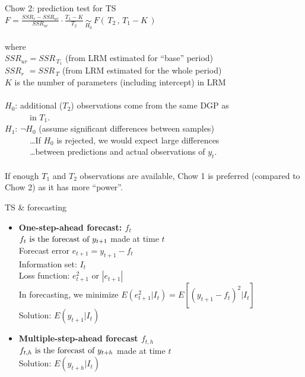 \documentclass{beamer}
\begin{document}
\begin{frame}{Chow 2: prediction test for TS}
~\\
$F = \frac{\textit{SSR}_{r}-\textit{SSR}_{ur}}{\textit{SSR}_{ur}}
   \cdot \frac{T_1-K}{T_2} \,
   \underset{H_0}{\sim} \,
   F(\,T_2 \,,\, T_1\!-\!K \, ) $ \\
~ \\
where\\
$\textit{SSR}_{ur} = \textit{SSR}_{\,T_1} $ (from LRM estimated for ``base'' period)\\
$\textit{SSR}_{r} \,\,= \textit{SSR}_{\,T}$  (from LRM estimated for the whole period)\\
$K$ is the number of parameters (including intercept) in LRM\\
~ \\
$H_0$: additional ($T_2$) observations come from the same DGP as\\ 
~~~~~~in $T_1$.\\
$H_1$: $\neg H_0$ (assume significant differences between samples)\\
~~~~~~\dots If $H_0$ is rejected, we would expect large differences\\
~~~~~~\dots between predictions and actual observations of $y_t$.\\
~ \\
\footnotesize{
If enough $T_1$ and $T_2$ observations are available, Chow 1 is preferred (compared to Chow 2) as it has more ``power''.}
\end{frame}
\begin{frame}{TS \& forecasting}
\begin{itemize}
\item \textbf{One-step-ahead forecast: $f_t$}\\
\smallskip
$f_t \textnormal{~is the forecast of~} y_{t+1}$ made at time $t$\\
Forecast error $e_{t+1}=y_{t+1}-f_t$\\
Information set: $I_t$\\
Loss function: $e^2_{t+1}$ or $|e_{t+1}|$\\
In forecasting, we minimize $E(e^2_{t+1}|I_t)=E[(y_{t+1}-f_t)^2|I_t]$\\
Solution: $E(y_{t+1}|I_t)$
\vspace{0.5cm}
\item \textbf{Multiple-step-ahead forecast $f_{t,h}$}\\
\smallskip
$f_{t,h} \textnormal{~is the forecast of~} y_{t+h}$ made at time $t$\\
Solution: $E(y_{t+h}|I_t)$
\end{itemize}
\end{frame}
\end{document}
